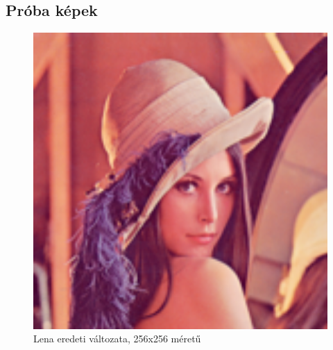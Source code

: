 \appendix
\chapter*{\fuggelek}
\setcounter{chapter}{\appendixnumber}

\section{Próba képek}
\label{sec:kepek}
\begin{figure}[!ht]
\centering
\includegraphics[width=150mm, keepaspectratio]{figures/lena_orig.png}
\caption{Lena eredeti változata, 256x256 méretű} 
\end{figure}

